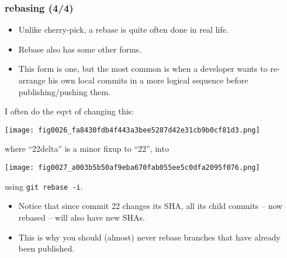 \documentclass[presentation]{beamer}
\begin{document}
\begin{frame}
\frametitle{rebasing (4/4)}
\label{sec-8-11}



\begin{itemize}
\item Unlike cherry-pick, a rebase is quite often done in real life.
\item Rebase also has some other forms.
\item This form is one, but the most common is when a developer wants to
  re-arrange his own local commits in a more logical sequence before
  publishing/pushing them.
\end{itemize}
\end{frame}
\begin{frame}

\small
I often do the eqvt of changing this:




\texttt{[image: fig0026\_fa8430fdb4f443a3bee5287d42e31cb9b0cf81d3.png]}



where ``22delta'' is a minor fixup to ``22'', into





\texttt{[image: fig0027\_a003b5b50af9eba670fab055ee5c0dfa2095f076.png]}




using \texttt{git rebase -i}.

\tiny
\begin{itemize}
\item Notice that since commit 22 changes its SHA, all its child commits
  -- now rebased -- will also have new SHAs.
\item This is why you should (almost) never rebase branches that have already been published.
\end{itemize}
\end{frame}
\end{document}
